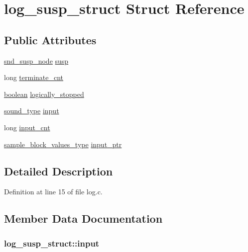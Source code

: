 \hypertarget{structlog__susp__struct}{}\section{log\+\_\+susp\+\_\+struct Struct Reference}
\label{structlog__susp__struct}
\subsection*{Public Attributes}
\begin{DoxyCompactItemize}
\item 
\hyperlink{sound_8h_a6b268203688a934bd798ceb55f85d4c0}{snd\+\_\+susp\+\_\+node} \hyperlink{structlog__susp__struct_a26ee486b6bce94dacf75c7d26ffa3340}{susp}
\item 
long \hyperlink{structlog__susp__struct_ae5f1e3e1b83663c009657ca5ba54422e}{terminate\+\_\+cnt}
\item 
\hyperlink{cext_8h_a7670a4e8a07d9ebb00411948b0bbf86d}{boolean} \hyperlink{structlog__susp__struct_abfd35b98368a909a32cde29522fab78a}{logically\+\_\+stopped}
\item 
\hyperlink{sound_8h_a792cec4ed9d6d636d342d9365ba265ea}{sound\+\_\+type} \hyperlink{structlog__susp__struct_a11b6f5cb9c22d5816d99962cc907e751}{input}
\item 
long \hyperlink{structlog__susp__struct_ac909568815246a93700b1acc4fa7aa2b}{input\+\_\+cnt}
\item 
\hyperlink{sound_8h_a83d17f7b465d1591f27cd28fc5eb8a03}{sample\+\_\+block\+\_\+values\+\_\+type} \hyperlink{structlog__susp__struct_ac3d55701e46fe120344e5820a6aa6a7a}{input\+\_\+ptr}
\end{DoxyCompactItemize}


\subsection{Detailed Description}


Definition at line 15 of file log.\+c.



\subsection{Member Data Documentation}
\subsubsection[{\texorpdfstring{input}{input}}]{ log\+\_\+susp\+\_\+struct\+::input}\hypertarget{structlog__susp__struct_a11b6f5cb9c22d5816d99962cc907e751}{}\label{structlog__susp__struct_a11b6f5cb9c22d5816d99962cc907e751}


